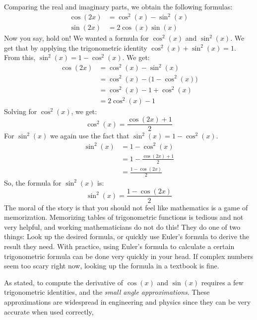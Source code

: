 \documentclass{article}
\theoremstyle{normal}
\theoremstyle{plain}
\begin{document}
    Comparing the real and imaginary parts, we obtain the following formulas:
    \begin{align}
        \cos(2x)&=\cos^{2}(x)-\sin^{2}(x)\\
        \sin(2x)&=2\cos(x)\sin(x)
    \end{align}
    Now you say, hold on! We wanted a formula for $\cos^{2}(x)$ and
    $\sin^{2}(x)$. We get that by applying the trigonometric identity
    $\cos^{2}(x)+\sin^{2}(x)=1$. From this, $\sin^{2}(x)=1-\cos^{2}(x)$. We get:
    \begin{align}
        \cos(2x)&=\cos^{2}(x)-\sin^{2}(x)\\
            &=\cos^{2}(x)-\big(1-\cos^{2}(x)\big)\\
            &=\cos^{2}(x)-1+\cos^{2}(x)\\
            &=2\cos^{2}(x)-1
    \end{align}
    Solving for $\cos^{2}(x)$, we get:
    \begin{equation}
        \cos^{2}(x)=\frac{\cos(2x)+1}{2}
    \end{equation}
    For $\sin^{2}(x)$ we again use the fact that $\sin^{2}(x)=1-\cos^{2}(x)$.
    \begin{align}
        \sin^{2}(x)&=1-\cos^{2}(x)\\
            &=1-\frac{\cos(2x)+1}{2}\\
            &=\frac{1-\cos(2x)}{2}
    \end{align}
    So, the formula for $\sin^{2}(x)$ is:
    \begin{equation}
        \sin^{2}(x)=\frac{1-\cos(2x)}{2}
    \end{equation}
    The moral of the story is that you should not feel like mathematics is a
    game of memorization. Memorizing tables of trigonometric functions is
    tedious and not very helpful, and working mathematicians do not do this!
    They do one of two things: Look up the desired formula, or quickly use
    Euler's formula to derive the result they need. With practice, using
    Euler's formula to calculate a certain trigonometric formula can be done
    very quickly in your head. If complex numbers seem too scary right now,
    looking up the formula in a textbook is fine.
    \par\hfill\par
    As stated, to compute the derivative of $\cos(x)$ and $\sin(x)$ requires
    a few trigonometric identities, and the
    \textit{small angle approximations}. These approximations are widespread in
    engineering and physics since they can be very accurate when used correctly,
\end{document}
